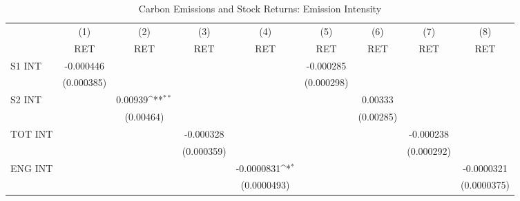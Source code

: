 \begin{table}[htbp]\centering
\def\sym#1{\ifmmode^{#1}\else\(^{#1}\)\fi}
\caption{Carbon Emissions and Stock Returns: Emission Intensity}
\begin{tabular}{l*{8}{c}}
\hline\hline
                    &\multicolumn{1}{c}{(1)}&\multicolumn{1}{c}{(2)}&\multicolumn{1}{c}{(3)}&\multicolumn{1}{c}{(4)}&\multicolumn{1}{c}{(5)}&\multicolumn{1}{c}{(6)}&\multicolumn{1}{c}{(7)}&\multicolumn{1}{c}{(8)}\\
                    &\multicolumn{1}{c}{RET}&\multicolumn{1}{c}{RET}&\multicolumn{1}{c}{RET}&\multicolumn{1}{c}{RET}&\multicolumn{1}{c}{RET}&\multicolumn{1}{c}{RET}&\multicolumn{1}{c}{RET}&\multicolumn{1}{c}{RET}\\
\hline
S1 INT              &   -0.000446         &                     &                     &                     &   -0.000285         &                     &                     &                     \\
                    &  (0.000385)         &                     &                     &                     &  (0.000298)         &                     &                     &                     \\
S2 INT              &                     &     0.00939\sym{**} &                     &                     &                     &     0.00333         &                     &                     \\
                    &                     &   (0.00464)         &                     &                     &                     &   (0.00285)         &                     &                     \\
TOT INT             &                     &                     &   -0.000328         &                     &                     &                     &   -0.000238         &                     \\
                    &                     &                     &  (0.000359)         &                     &                     &                     &  (0.000292)         &                     \\
ENG INT             &                     &                     &                     &  -0.0000831\sym{*}  &                     &                     &                     &  -0.0000321         \\
                    &                     &                     &                     & (0.0000493)         &                     &                     &                     & (0.0000375)         \\

\end{tabular}
\end{table}
